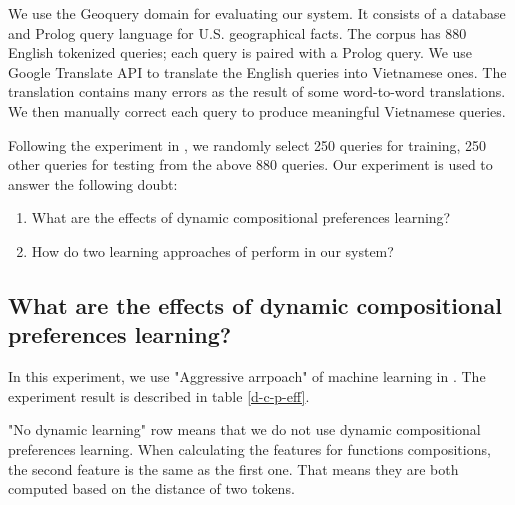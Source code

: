 \label{sec:experiment}
We use the Geoquery domain for evaluating our system. It consists of a database and Prolog query language for U.S. geographical facts. The corpus has 880 English tokenized queries; each query is paired with a Prolog query. We use Google Translate API to translate the English queries into Vietnamese ones. The translation contains many errors as the result of some word-to-word translations. We then manually correct each query to produce meaningful Vietnamese queries. 

Following the experiment in \cite{Clarke:2010:DSP:1870568.1870571}, we randomly select 250 queries for training, 250 other queries for testing from the above 880 queries. Our experiment is used to answer the following doubt:

\begin{enumerate}
  \item What are the effects of dynamic compositional preferences learning?
  \item How do two learning approaches of \cite{Clarke:2010:DSP:1870568.1870571} perform in our system?
\end{enumerate}

\subsection{What are the effects of dynamic compositional preferences learning?}
In this experiment, we use "Aggressive arrpoach" of machine learning in \cite{Clarke:2010:DSP:1870568.1870571}. The experiment result is described in table \ref{d-c-p-eff}. 

"No dynamic learning" row means that we do not use dynamic compositional preferences learning. When calculating the features for functions compositions, the second feature is the same as the first one. That means they are both computed based on the distance of two tokens.

